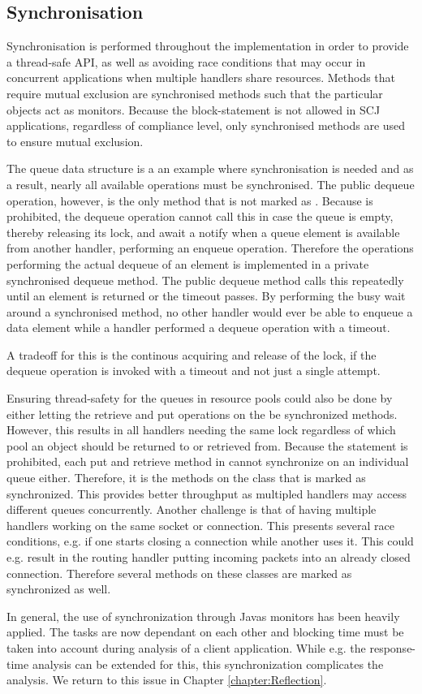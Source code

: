 \subsection{Synchronisation} %
\label{sub:synchronization}
Synchronisation is performed throughout the implementation in order to provide a thread-safe API, as well as avoiding race conditions that may occur in concurrent applications when multiple handlers share resources. Methods that require mutual exclusion are synchronised methods such that the particular objects act as monitors. Because the  block-statement is not allowed in SCJ applications, regardless of compliance level, only synchronised methods are used to ensure mutual exclusion.

The queue data structure is a an example where synchronisation is needed and as a result, nearly all available operations must be synchronised. The public dequeue operation, however, is the only method that is not marked as . Because  is prohibited, the dequeue operation cannot call this in case the queue is empty, thereby releasing its lock, and await a notify when a queue element is available from another handler, performing an enqueue operation. Therefore the operations performing the actual dequeue of an element is implemented in a private synchronised dequeue method. The public dequeue method calls this repeatedly until an element is returned or the timeout passes. By performing the busy wait around a synchronised method, no other handler would ever be able to enqueue a data element while a handler performed a dequeue operation with a timeout. 


A tradeoff for this is the continous acquiring and release of the lock, if the dequeue operation is invoked with a timeout and not just a single attempt.

Ensuring thread-safety for the queues in resource pools could also be done by either letting the retrieve and put operations on the  be synchronized methods. However, this results in all handlers needing the same lock regardless of which pool an object should be returned to or retrieved from. Because the  statement is prohibited, each put and retrieve method in  cannot synchronize on an individual queue either. Therefore, it is the methods on the  class that is marked as synchronized. This provides better throughput as multipled handlers may access different queues concurrently. Another challenge is that of having multiple handlers working on the same socket or connection. This presents several race conditions, e.g. if one starts closing a connection while another uses it. This could e.g. result in the routing handler putting incoming packets into an already closed connection. Therefore several methods on these classes are marked as synchronized as well.

In general, the use of synchronization through Javas monitors has been heavily applied. The tasks are now dependant on each other and blocking time must be taken into account during analysis of a client application. While e.g. the response-time analysis can be extended for this\cite{alan2001real}, this synchronization complicates the analysis. We return to this issue in Chapter \ref{chapter:Reflection}.